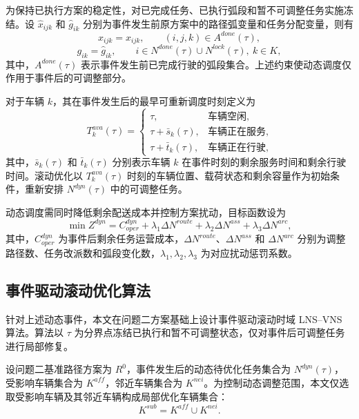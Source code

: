 \documentclass[withoutpreface,bwprint]{cumcmthesis} %
\begin{document}
为保持已执行方案的稳定性，对已完成任务、已执行弧段和暂不可调整任务实施冻结。设 $\hat{x}_{ijk}$ 和 $\hat{g}_{ik}$ 分别为事件发生前原方案中的路径弧变量和任务分配变量，则有
\begin{equation}
x_{ijk}=\hat{x}_{ijk},\qquad (i,j,k)\in A^{done}(\tau),
\end{equation}
\begin{equation}
g_{ik}=\hat{g}_{ik},\qquad i\in N^{done}(\tau)\cup N^{lock}(\tau),\ k\in K,
\end{equation}
其中，$A^{done}(\tau)$ 表示事件发生前已完成行驶的弧段集合。上述约束使动态调度仅作用于事件后的可调整部分。

对于车辆 $k$，其在事件发生后的最早可重新调度时刻定义为
\begin{equation}
T_k^{ava}(\tau)=
\begin{cases}
\tau, & \text{车辆空闲},\\
\tau+\bar{s}_k(\tau), & \text{车辆正在服务},\\
\tau+\bar{t}_k(\tau), & \text{车辆正在行驶},
\end{cases}
\end{equation}
其中，$\bar{s}_k(\tau)$ 和 $\bar{t}_k(\tau)$ 分别表示车辆 $k$ 在事件时刻的剩余服务时间和剩余行驶时间。滚动优化以 $T_k^{ava}(\tau)$ 时刻的车辆位置、载荷状态和剩余容量作为初始条件，重新安排 $N^{dyn}(\tau)$ 中的可调整任务。

动态调度需同时降低剩余配送成本并控制方案扰动，目标函数设为
\begin{equation}
\min Z^{dyn}
=
C^{dyn}_{oper}
+
\lambda_1\Delta N^{route}
+
\lambda_2\Delta N^{ass}
+
\lambda_3\Delta N^{arc},
\label{eq:dynamic_objective}
\end{equation}
其中，$C^{dyn}_{oper}$ 为事件后剩余任务运营成本，$\Delta N^{route}$、$\Delta N^{ass}$ 和 $\Delta N^{arc}$ 分别为调整路径数、任务改派数和弧段变化数，$\lambda_1,\lambda_2,\lambda_3$ 为对应扰动惩罚系数。

\subsection{事件驱动滚动优化算法}

针对上述动态事件，本文在问题二方案基础上设计事件驱动滚动时域 LNS--VNS 算法。算法以 $\tau$ 为分界点冻结已执行和暂不可调整状态，仅对事件后可调整任务进行局部修复。

设问题二基准路径方案为 $R^0$，事件发生后的动态待优化任务集合为 $N^{dyn}(\tau)$，受影响车辆集合为 $K^{aff}$，邻近车辆集合为 $K^{nei}$。为控制动态调整范围，本文仅选取受影响车辆及其邻近车辆构成局部优化车辆集合：
\begin{equation}
K^{sub}=K^{aff}\cup K^{nei}.
\end{equation}
\end{document}
